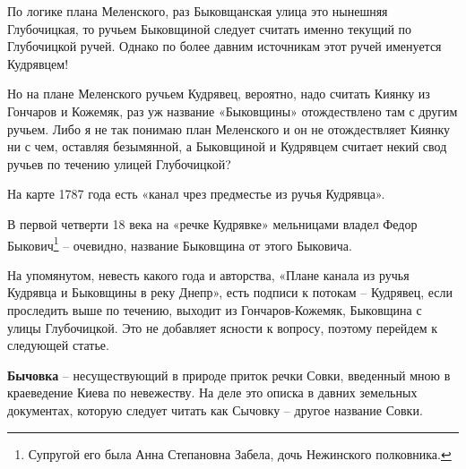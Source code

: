 По логике плана Меленского, раз Быковщанская улица это нынешняя Глубочицкая, то ручьем Быковщиной следует считать именно текущий по Глубочицкой ручей. Однако по более давним источникам этот ручей именуется Кудрявцем!

Но на плане Меленского ручьем Кудрявец, вероятно, надо считать Киянку из Гончаров и Кожемяк, раз уж название «Быковщины» отождествлено там с другим ручьем. Либо я не так понимаю план Меленского и он не отождествляет Киянку ни с чем, оставляя безымянной, а Быковщиной и Кудрявцем считает некий свод ручьев по течению улицей Глубочицкой?

На карте 1787 года есть «канал чрез предместье из ручья Кудрявца».

В первой четверти 18 века на «речке Кудрявке» мельницами владел Федор Быкович\footnote{Супругой его была Анна Степановна Забела, дочь Нежинского полковника.} – очевидно, название Быковщина от этого Быковича.

На упомянутом, невесть какого года и авторства, «Плане канала из ручья Кудрявца и Быковщины в реку Днепр», есть подписи к потокам – Кудрявец, если проследить выше по течению, выходит из Гончаров-Кожемяк, Быковщина с улицы Глубочицкой. Это не добавляет ясности к вопросу, поэтому перейдем к следующей статье.\\

\medskip

\textbf{Бычовка} – несуществующий в природе приток речки Совки, введенный мною в краеведение Киева по невежеству. На деле это описка в давних земельных документах, которую следует читать как Сычовку – другое название Совки.
